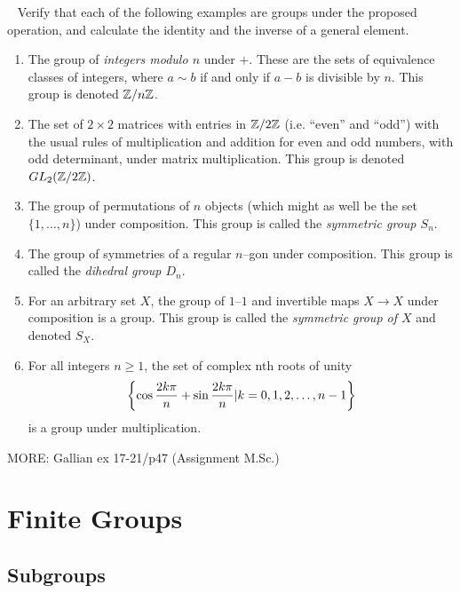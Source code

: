 \begin{xcb}{~}
        Verify that each of the following examples are groups under the proposed
        operation, and calculate the identity and the inverse of a general element.
        \begin{enumerate}
                      \item{The group of {\em integers modulo $n$} under $+$. These are the sets
                        of equivalence classes of integers, where $a \sim b$ if and only if $a-b$ is
                        divisible by $n$. This group is denoted $\mathbb Z/n\mathbb Z$.}
                \item{The set of $2\times 2$ matrices with entries in $\mathbb Z/2\mathbb Z$ (i.e. ``even'' and
                        ``odd'') with the usual rules of multiplication and addition for
                        even and odd numbers, with odd determinant, under matrix multiplication. This
                        group is denoted $GL_2(\mathbb Z/2\mathbb Z)$.}
                \item{The group of permutations of $n$ objects (which might as well be the
                        set $\lbrace 1, \dots , n \rbrace$) under composition. This group is called the
                        {\em symmetric group $S_n$}.}
                \item{The group of symmetries of a regular $n$--gon under composition.
                        This group is called the {\em dihedral group $D_n$}.}
                \item{For an arbitrary set $X$, the group of $1$--$1$ and invertible maps $X \to X$
                        under composition is a group. This group is called the {\em symmetric group of
                                $X$} and denoted $S_X$.}
                 \item For all integers $n\ge 1$, the set of complex nth roots of unity
                 \[\left\{\cos \frac{2k\pi}{n} + \sin \frac{2k\pi}{n} | k=0,1,2, \ldots, n-1\right\}\]
                 is a group under multiplication.
        \end{enumerate}
        
   MORE: Gallian ex 17-21/p47 (Assignment M.Sc.)   
        \end{xcb}
\chapter{Finite Groups}
\section{Subgroups}
